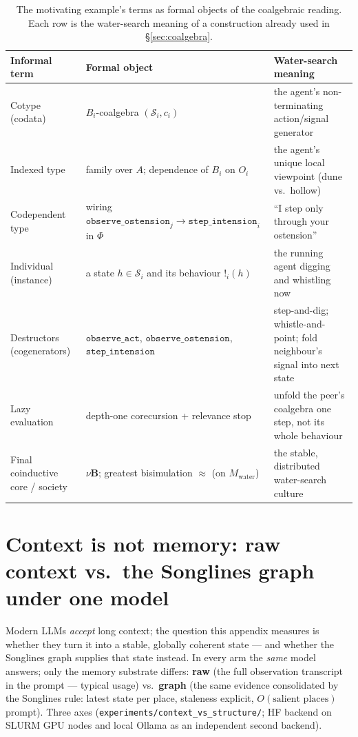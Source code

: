\documentclass{article}
\newcommand{\method}[1]{\texttt{#1}}
\begin{document}
\begin{table}[t]
\caption{The motivating example's terms as formal objects of the coalgebraic
reading. Each row is the water-search meaning of a construction already used
in \S\ref{sec:coalgebra}.}
\label{tab:coalg-dictionary}
\centering
\small
\begin{tabular}{p{2.9cm} p{4.3cm} p{4.4cm}}
\toprule
Informal term & Formal object & Water-search meaning \\
\midrule
Cotype (codata) & $B_i$-coalgebra $(\mathcal{S}_i,c_i)$ & the agent's non-terminating action/signal generator \\
Indexed type & family over $A$; dependence of $B_i$ on $O_i$ & the agent's unique local viewpoint (dune vs.\ hollow) \\
Codependent type & wiring $\method{observe\_ostension}_j\!\to\!\method{step\_intension}_i$ in $\Phi$ & ``I step only through your ostension'' \\
Individual (instance) & a state $h\in\mathcal{S}_i$ and its behaviour $!_i(h)$ & the running agent digging and whistling now \\
Destructors (cogenerators) & $\method{observe\_act}$, $\method{observe\_ostension}$, $\method{step\_intension}$ & step-and-dig; whistle-and-point; fold neighbour's signal into next state \\
Lazy evaluation & depth-one corecursion + relevance stop & unfold the peer's coalgebra one step, not its whole behaviour \\
Final coinductive core / society & $\nu\mathbf{B}$; greatest bisimulation $\approx$ (on $M_{\mathrm{water}}$) & the stable, distributed water-search culture \\
\bottomrule
\end{tabular}
\end{table}


\section{Context is not memory: raw context vs.\ the Songlines graph under one model}
\label{app:ctx-vs-structure}

Modern LLMs \emph{accept} long context; the question this appendix measures is
whether they turn it into a stable, globally coherent state --- and whether the
Songlines graph supplies that state instead. In every arm the \emph{same} model
answers; only the memory substrate differs: \textbf{raw} (the full observation
transcript in the prompt --- typical usage) vs.\ \textbf{graph} (the same
evidence consolidated by the Songlines rule: latest state per place, staleness
explicit, $O(\text{salient places})$ prompt). Three axes
(\method{experiments/context\_vs\_structure/}; HF backend on SLURM GPU nodes
and local Ollama as an independent second backend).
\end{document}
